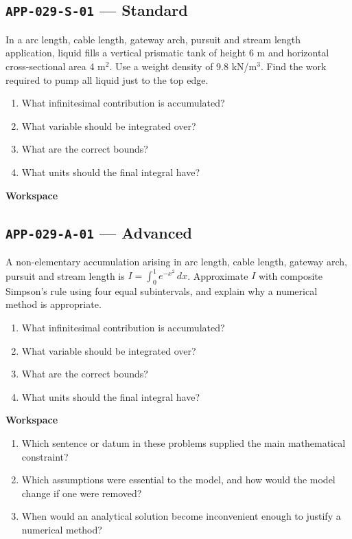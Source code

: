 \documentclass[11pt]{book}
\newcommand{\pid}[1]{\texttt{#1}}
\newcommand{\workspace}{\par\vspace{0.7in}\hrulefill\par\vspace{0.55in}\hrulefill\par}
\begin{document}
\subsection*{\pid{APP-029-S-01} — Standard}
\begin{problembox}
In a arc length, cable length, gateway arch, pursuit and stream length application, liquid fills a vertical prismatic tank of height 6 m and horizontal cross-sectional area 4 m$^2$. Use a weight density of 9.8 kN/m$^3$. Find the work required to pump all liquid just to the top edge.
\end{problembox}
\begin{promptbox}\begin{enumerate}
\item What infinitesimal contribution is accumulated?
\item What variable should be integrated over?
\item What are the correct bounds?
\item What units should the final integral have?
\end{enumerate}\end{promptbox}
\textbf{Workspace}\workspace
{}
\subsection*{\pid{APP-029-A-01} — Advanced}
\begin{problembox}
A non-elementary accumulation arising in arc length, cable length, gateway arch, pursuit and stream length is $I=\int_0^1 e^{-x^2}\,dx$. Approximate $I$ with composite Simpson's rule using four equal subintervals, and explain why a numerical method is appropriate.
\end{problembox}
\begin{promptbox}\begin{enumerate}
\item What infinitesimal contribution is accumulated?
\item What variable should be integrated over?
\item What are the correct bounds?
\item What units should the final integral have?
\end{enumerate}\end{promptbox}
\textbf{Workspace}\workspace
\begin{reflectionbox}\begin{enumerate}
\item Which sentence or datum in these problems supplied the main mathematical constraint?
\item Which assumptions were essential to the model, and how would the model change if one were removed?
\item When would an analytical solution become inconvenient enough to justify a numerical method?
\end{enumerate}\end{reflectionbox}
\end{document}

